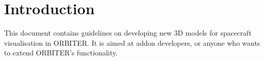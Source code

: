 \documentclass[Orbiter Developer Manual.tex]{subfiles}
\begin{document}
\section{Introduction}
This document contains guidelines on developing new 3D models for spacecraft visualisation in ORBITER. It is aimed at addon developers, or anyone who wants to extend ORBITER’s functionality.
\end{document}
